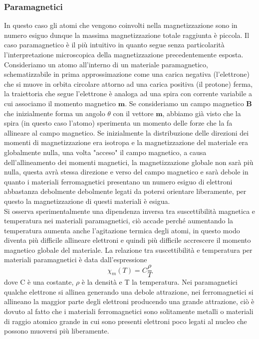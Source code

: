 \documentclass[
10pt, %
a4paper, %
oneside, %
headinclude,footinclude, %
BCOR5mm, %
]{scrartcl}
\begin{document}
\subsubsection{Paramagnetici}
In questo caso gli atomi che vengono coinvolti nella magnetizzazione sono in numero esiguo dunque la massima magnetizzazione totale raggiunta è piccola.
Il caso paramagnetico è il più intuitivo in quanto segue senza particolarità l'interpretazione microscopica della magnetizzazione precedentemente esposta.\\ 
Consideriamo un atomo all'interno di un materiale paramagnetico, schematizzabile in prima approssimazione come una carica negativa (l'elettrone) che si muove in orbita circolare attorno ad una carica positiva (il protone) ferma, la traiettoria che segue l'elettrone è analoga ad una spira con corrente variabile a cui associamo il momento magnetico \(\mathbf{m}\). Se consideriamo un campo magnetico \(\mathbf{B}\) che inizialmente forma un angolo $\theta$ con il vettore \(\mathbf{m}\), abbiamo già visto che la spira (in questo caso l'atomo) sperimenta un momento delle forze che la fa allineare al campo magnetico. Se inizialmente la distribuzione delle direzioni dei momenti di magnetizzazione era isotropa e la magnetizzazione del materiale era globalmente nulla, una volta "acceso" il campo magnetico, a causa dell'allineamento dei momenti magnetici, la magnetizzazione globale non sarà più nulla, questa avrà stessa direzione e verso del campo magnetico e sarà debole in quanto i materiali ferromagnetici presentano un numero esiguo di elettroni abbastanza debolmente debolmente legati da potersi orientare liberamente, per questo la magnetizzazione di questi materiali è esigua.\\
Si osserva sperimentalmente una dipendenza inversa tra suscettibilità magnetica e temperatura nei materiali paramagnetici, ciò accade perché aumentando la temperatura aumenta anche l'agitazione termica degli atomi, in questo modo diventa più difficile allineare elettroni e quindi più difficile accrescere il momento magnetico globale del materiale.
La relazione tra suscettibilità e temperatura per materiali paramagnetici è data dall'espressione
\[\chi_m (T) = C \frac{\rho}{T}\]
dove C è una costante, $\rho$ è la densità e T la temperatura. Nei paramagnetici qualche elettrone si allinea generando una debole attrazione, nei ferromagnetici si allineano la maggior parte degli elettroni producendo una grande attrazione, ciò è dovuto al fatto che i materiali ferromagnetici sono solitamente metalli o materiali di raggio atomico grande in cui sono presenti elettroni poco legati al nucleo che possono muoversi più liberamente. 
\end{document}
